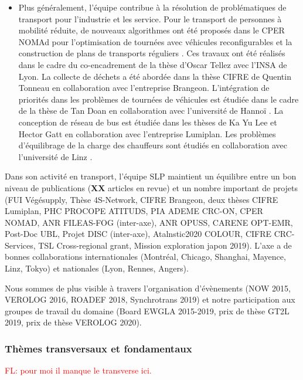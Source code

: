 \begin{itemize}
    \item Plus généralement, l'équipe contribue à la résolution de problématiques de transport pour l'industrie et les service. Pour le transport de personnes à mobilité réduite, de nouveaux algorithmes ont été proposés dans le CPER NOMAd pour l'optimisation de tournées avec véhicules reconfigurables \cite{tellez:hal-01768291} et la construction de plans de transports réguliers \cite{tellez:hal-02460670}. 
    Ces travaux ont été réalisés dans le cadre du co-encadrement de la thèse d'Oscar Tellez avec l'INSA de Lyon. 
    La collecte de déchets a été abordée dans la thèse CIFRE de Quentin Tonneau \cite{tonneau:hal-01621297, tonneau:tel-01729672} en collaboration avec l'entreprise Brangeon. 
    L'intégration de priorités dans les problèmes de  tournées de véhicules est étudiée dans le cadre de la thèse de Tan Doan en collaboration avec l'université de Hannoï \cite{}. 
    La conception de réseau de bus est étudiée dans les thèses de Ka Yu Lee \cite{lee:hal-01626949} et Hector Gatt en collaboration avec l'entreprise Lumiplan.
    Les problèmes d'équilibrage de la charge des chauffeurs sont étudiés en collaboration avec l'université de Linz \cite{lehuede:hal-02296076}.
\end{itemize}

Dans son activité en transport, l'équipe SLP maintient un équilibre entre  un bon niveau de publications (\textbf{XX} articles en revue) et un nombre important de projets (FUI Végésupply, Thèse 4S-Network, CIFRE Brangeon, deux thèses CIFRE Lumiplan, PHC PROCOPE ATITUDS, PIA ADEME CRC-ON, CPER NOMAD, ANR FILEAS-FOG (inter-axe), ANR OPUSS, CARENE OPT-EMR, Post-Doc UBL, Projet DISC (inter-axe), Atalnstic2020 COLOUR, CIFRE CRC-Services, TSL Cross-regional grant, Mission exploration japon 2019). 
L'axe a de bonnes collaborations internationales (Montréal, Chicago, Shanghai, Mayence, Linz, Tokyo) et nationales (Lyon, Rennes, Angers). 

Nous sommes de plus visible à travers l'organisation d'évènements (NOW 2015, VEROLOG 2016, ROADEF 2018, Synchrotrans 2019) et notre participation aux groupes de travail du domaine (Board EWGLA 2015-2019, prix de thèse GT2L 2019, prix de thèse VEROLOG 2020).

\subsubsection{Thèmes transversaux et fondamentaux}

\textcolor{red}{FL: pour moi il manque le transverse ici. }
  
